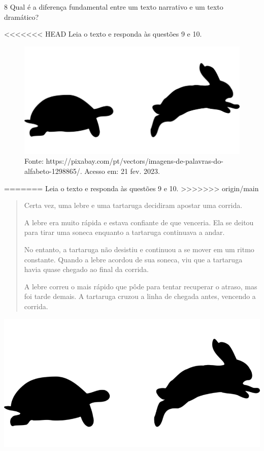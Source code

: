 \num{8} Qual é a diferença fundamental entre um texto narrativo e um texto dramático?



<<<<<<< HEAD
Leia o texto e responda às questões 9 e 10.

\begin{figure}[htpb!]
\includegraphics[width=.5\textwidth]{./imgs/img6.png}
\caption{Fonte: https://pixabay.com/pt/vectors/imagens-de-palavras-do-alfabeto-1298865/. Acesso em: 21 fev. 2023.}
\end{figure}
=======
Leia o texto e responda às questões 9 e 10.\medskip
>>>>>>> origin/main

\begin{minipage}{.5\textwidth}
\begin{quote}
Certa vez, uma lebre e uma tartaruga decidiram apostar uma corrida.

A lebre era muito rápida e estava confiante de que venceria. Ela se
deitou para tirar uma soneca enquanto a tartaruga continuava a andar.

No entanto, a tartaruga não desistiu e continuou a se mover em um ritmo
constante. Quando a lebre acordou de sua soneca, viu que a tartaruga
havia quase chegado ao final da corrida.

A lebre correu o mais rápido que pôde para tentar recuperar o atraso,
mas foi tarde demais. A tartaruga cruzou a linha de chegada antes,
vencendo a corrida.
\end{quote}
\end{minipage}
\begin{minipage}{.5\textwidth}
\includegraphics[width=\textwidth]{./imgs/img6.png}
\end{minipage}

